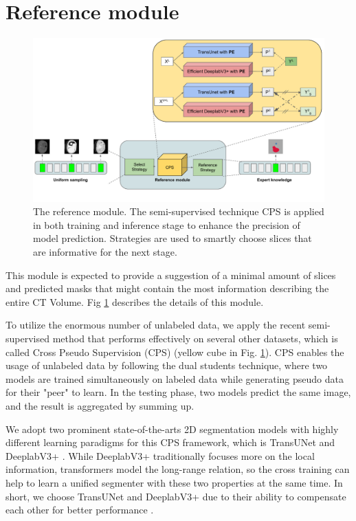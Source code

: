 \section{Reference module}
\label{sec:reference}
\begin{figure}[!h]
    \centering
    \includegraphics[width=\textwidth]{content/resources/new_images/reference.pdf}
    \caption{The reference module. The semi-supervised technique CPS is applied in both training and inference stage to enhance the precision of model prediction. Strategies are used to smartly choose slices that are informative for the next stage. }
    \label{fig:reference}
\end{figure}


This module is expected to provide a suggestion of a minimal amount of slices and predicted masks that might contain the most information describing the entire CT Volume. Fig \ref{fig:reference} describes the details of this module.

To utilize the enormous number of unlabeled data, we apply the recent semi-supervised method that performs effectively on several other datasets, which is called Cross Pseudo Supervision (CPS) \cite{chen2021semisupervised} (yellow cube in Fig. \ref{fig:reference}).
CPS enables the usage of unlabeled data by following the dual students technique, where two models are trained simultaneously on labeled data while generating pseudo data for their "peer" to learn. In the testing phase, two models predict the same image, and the result is aggregated by summing up.

We adopt two prominent state-of-the-arts 2D segmentation models with highly different learning paradigms for this CPS framework, which is TransUNet \cite{transunet21chen} and DeeplabV3+ \cite{dlv3p18chen}. While DeeplabV3+ traditionally focuses more on the local information, transformers model the long-range relation, so the cross training can help to learn a unified segmenter with these two properties at the same time. In short, we choose TransUNet and DeeplabV3+ due to their ability to compensate each other for better performance \cite{luo2021semisupervised}. 

